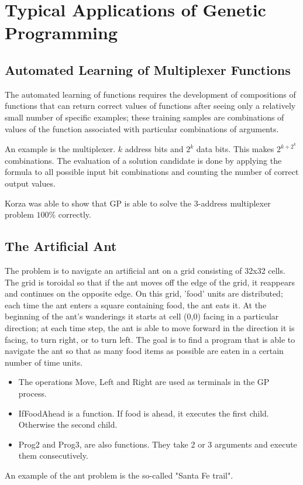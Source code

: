 \documentclass[12pt]{book}
\begin{document}
\section{Typical Applications of Genetic Programming}
\subsection{Automated Learning of Multiplexer Functions}
The automated learning of functions requires the development of compositions of functions that can return correct values of functions after seeing only a relatively small number of specific examples; these training samples are combinations of values of the function associated with particular combinations of arguments.

An example is the multiplexer. $k$ address bits and $2^k$ data bits. This makes $2^{k+2^k}$ combinations. The evaluation of a solution candidate is done by applying the formula to all possible input bit combinations and counting the number of correct output values.

Korza was able to show that GP is able to solve the 3-address multiplexer problem $100\%$ correctly.

\subsection{The Artificial Ant}
The problem is to navigate an artificial ant on a grid consisting of 32x32 cells. The grid is toroidal so that if the ant moves off the edge of the grid, it reappears and continues on the opposite edge. On this grid, 'food' units are distributed; each time the ant enters a square containing food, the ant eats it. At the beginning of the ant's wanderings it starts at cell (0,0) facing in a particular direction; at each time step, the ant is able to move forward in the direction it is facing, to turn right, or to turn left. The goal is to find a program that is able to navigate the ant so that as many food items as possible are eaten in a certain number of time units.
\begin{itemize}
\item The operations Move, Left and Right are used as terminals in the GP process.
\item IfFoodAhead is a function. If food is ahead, it executes the first child. Otherwise the second child.
\item Prog2 and Prog3, are also functions. They take 2 or 3 arguments and execute them consecutively.
\end{itemize}
An example of the ant problem is the so-called "Santa Fe trail".
\end{document}
